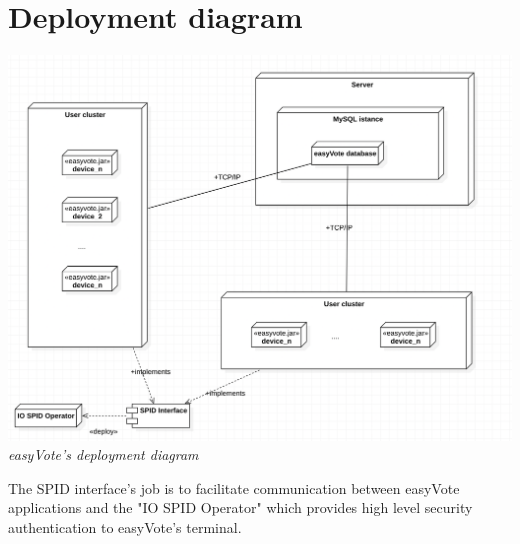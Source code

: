 \documentclass[11pt, oneside]{article}   	%
\begin{document}
\section{Deployment diagram}
\begin{center}
    \includegraphics[scale=0.5]{images/deployment.png}\\
    \emph{easyVote's deployment diagram}
    \end{center}
The SPID interface's job is to facilitate communication between easyVote applications and the "IO SPID Operator" which provides high level security authentication to easyVote's terminal.
    \pagebreak
    
\end{document}
